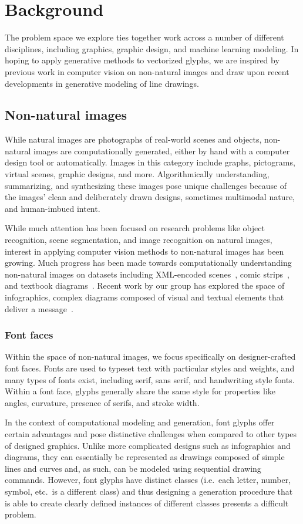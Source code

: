\chapter{Background}
The problem space we explore ties together work across a number of different disciplines, including graphics, graphic design, and machine learning modeling.
In hoping to apply generative methods to vectorized glyphs, we are inspired by previous work in computer vision on non-natural images and draw upon recent developments in generative modeling of line drawings.

\section{Non-natural images}
While natural images are photographs of real-world scenes and objects, non-natural images are computationally generated, either by hand with a computer design tool or automatically.
Images in this category include graphs, pictograms, virtual scenes, graphic designs, and more.
Algorithmically understanding, summarizing, and synthesizing these images pose unique challenges because of the images' clean and deliberately drawn designs, sometimes multimodal nature, and human-imbued intent. 

While much attention has been focused on research problems like object recognition, scene segmentation, and image recognition on natural images, interest in applying computer vision methods to non-natural images has been growing.
Much progress has been made towards computationally understanding non-natural images on datasets including XML-encoded scenes~\cite{wu2017neural}, comic strips~\cite{iyyer2016amazing}, and textbook diagrams~\cite{seo2014diagram}.
Recent work by our group has explored the space of infographics, complex diagrams composed of visual and textual elements that deliver a message~\cite{bylinskii2017understanding}.

\subsection{Font faces}
Within the space of non-natural images, we focus specifically on designer-crafted font faces.
Fonts are used to typeset text with particular styles and weights, and many types of fonts exist, including serif, sans serif, and handwriting style fonts.
Within a font face, glyphs generally share the same style for properties like angles, curvature, presence of serifs, and stroke width.

In the context of computational modeling and generation, font glyphs offer certain advantages and pose distinctive challenges when compared to other types of designed graphics.
Unlike more complicated designs such as infographics and diagrams, they can essentially be represented as drawings composed of simple lines and curves and, as such, can be modeled using sequential drawing commands.
However, font glyphs have distinct classes (i.e.\ each letter, number, symbol, etc.\ is a different class) and thus designing a generation procedure that is able to create clearly defined instances of different classes presents a difficult problem.

